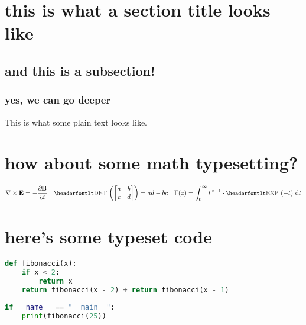 \documentclass[11pt]{article}
\begin{document}
\section{this is what a section title looks like}
\subsection{and this is a subsection!}
\subsubsection{yes, we can go deeper}
This is what some plain text looks like.

\section{how about some math typesetting?}

\begin{align*}
\nabla \times \vec{E} = - \frac{\Partial{\vec{B}}}{\Partial{t}} &&
\op{det} \left( \begin{bmatrix} a & b \\ c & d \end{bmatrix} \right) = ad - bc &&
\Gamma(z) = \int_0^{\infty} t^{\,z-1} \cdot \op{exp}\left(-t\right) \,\D{t} 
\end{align*}

\section{here's some typeset code}

\begin{lstlisting}[language=Python]
def fibonacci(x):
    if x < 2: 
        return x 
    return fibonacci(x - 2) + return fibonacci(x - 1)
    
if __name__ == "__main__":
    print(fibonacci(25))
\end{lstlisting}
\end{document}
